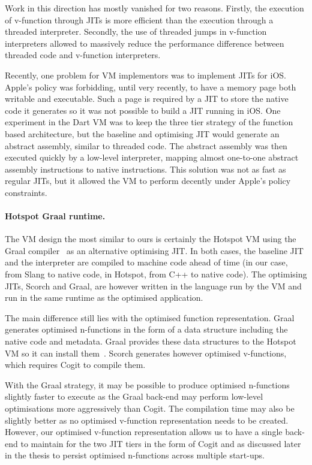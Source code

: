 \documentclass[a4paper,12pt,twoside]{../includes/ThesisStyle}
\begin{document}
Work in this direction has mostly vanished for two reasons. Firstly, the execution of v-function through JITs is more efficient than the execution through a threaded interpreter. Secondly, the use of threaded jumps in v-function interpreters allowed to massively reduce the performance difference between threaded code and v-function interpreters.

Recently, one problem for VM implementors was to implement JITs for iOS. Apple's policy was forbidding, until very recently, to have a memory page both writable and executable. Such a page is required by a JIT to store the native code it generates so it was not possible to build a JIT running in iOS. One experiment in the Dart VM was to keep the three tier strategy of the function based architecture, but the baseline and optimising JIT would generate an abstract assembly, similar to threaded code. The abstract assembly was then executed quickly by a low-level interpreter, mapping almost one-to-one abstract assembly instructions to native instructions. This solution was not as fast as regular JITs, but it allowed the VM to perform decently under Apple's policy constraints.

\paragraph{Hotspot Graal runtime.}
The VM design the most similar to ours is certainly the Hotspot VM using the Graal compiler~\cite{Oracle13,Dubo13c} as an alternative optimising JIT. In both cases, the baseline JIT and the interpreter are compiled to machine code ahead of time (in our case, from Slang to native code, in Hotspot, from C++ to native code). The optimising JITs, Scorch and Graal, are however written in the language run by the VM and run in the same runtime as the optimised application. 

The main difference still lies with the optimised function representation. Graal generates optimised n-functions in the form of a data structure including the native code and metadata. Graal provides these data structures to the Hotspot VM so it can install them~\cite{Grim13a}. Scorch generates however optimised v-functions, which requires Cogit to compile them. 

With the Graal strategy, it may be possible to produce optimised n-functions slightly faster to execute as the Graal back-end may perform low-level optimisations more aggressively than Cogit. The compilation time may also be slightly better as no optimised v-function representation needs to be created. However, our optimised v-function representation allows us to have a single back-end to maintain for the two JIT tiers in the form of Cogit and as discussed later in the thesis to persist optimised n-functions across multiple start-ups.
\end{document}
